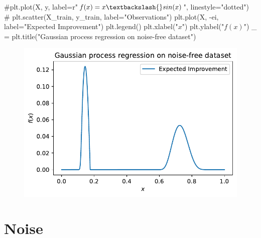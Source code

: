 \documentclass[
  letterpaper,
  DIV=11,
  numbers=noendperiod]{scrreprt}
\newenvironment{Shaded}{\begin{snugshade}}{\end{snugshade}}
\newcommand{\CommentTok}[1]{\textcolor[rgb]{0.37,0.37,0.37}{#1}}
\newcommand{\NormalTok}[1]{\textcolor[rgb]{0.00,0.23,0.31}{#1}}
\newcommand{\OperatorTok}[1]{\textcolor[rgb]{0.37,0.37,0.37}{#1}}
\newcommand{\StringTok}[1]{\textcolor[rgb]{0.13,0.47,0.30}{#1}}
\begin{document}
\begin{Shaded}
\begin{Highlighting}[]
\CommentTok{\#plt.plot(X, y, label=r"$f(x) = x \textbackslash{}sin(x)$", linestyle="dotted")}
\CommentTok{\# plt.scatter(X\_train, y\_train, label="Observations")}
\NormalTok{plt.plot(X, }\OperatorTok{{-}}\NormalTok{ei, label}\OperatorTok{=}\StringTok{"Expected Improvement"}\NormalTok{)}
\NormalTok{plt.legend()}
\NormalTok{plt.xlabel(}\StringTok{"$x$"}\NormalTok{)}
\NormalTok{plt.ylabel(}\StringTok{"$f(x)$"}\NormalTok{)}
\NormalTok{\_ }\OperatorTok{=}\NormalTok{ plt.title(}\StringTok{"Gaussian process regression on noise{-}free dataset"}\NormalTok{)}
\end{Highlighting}
\end{Shaded}

\begin{figure}[H]

{\centering \includegraphics{012_num_spot_ei_files/figure-pdf/cell-49-output-1.pdf}

}

\end{figure}

\hypertarget{noise}{%
\section{Noise}\label{noise}}
\end{document}
